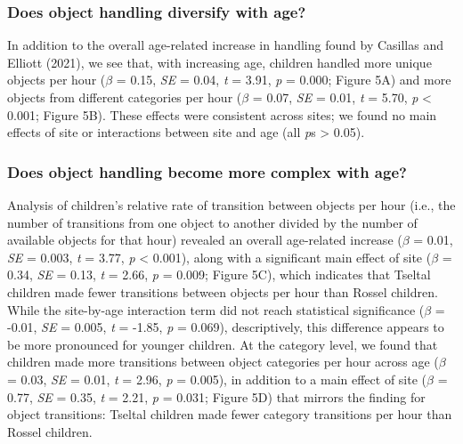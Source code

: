\documentclass[10pt, letterpaper]{article}
\begin{document}
\hypertarget{does-object-handling-diversify-with-age}{%
\subsubsection{Does object handling diversify with
age?}\label{does-object-handling-diversify-with-age}}

In addition to the overall age-related increase in handling found by
Casillas and Elliott (2021), we see that, with increasing age, children
handled more unique objects per hour (\(\beta\) = 0.15, \emph{SE} =
0.04, \emph{t} = 3.91, \emph{p} = 0.000; Figure 5A) and more objects
from different categories per hour (\(\beta\) = 0.07, \emph{SE} = 0.01,
\emph{t} = 5.70, \emph{p} \textless{} 0.001; Figure 5B). These effects
were consistent across sites; we found no main effects of site or
interactions between site and age (all \emph{p}s \textgreater{}
0.05).\newline

\hypertarget{does-object-handling-become-more-complex-with-age}{%
\subsubsection{Does object handling become more complex with
age?}\label{does-object-handling-become-more-complex-with-age}}

Analysis of children's relative rate of transition between objects per
hour (i.e., the number of transitions from one object to another divided
by the number of available objects for that hour) revealed an overall
age-related increase (\(\beta\) = 0.01, \emph{SE} = 0.003, \emph{t} =
3.77, \emph{p} \textless{} 0.001), along with a significant main effect
of site (\(\beta\) = 0.34, \emph{SE} = 0.13, \emph{t} = 2.66, \emph{p} =
0.009; Figure 5C), which indicates that Tseltal children made fewer
transitions between objects per hour than Rossel children. While the
site-by-age interaction term did not reach statistical significance
(\(\beta\) = -0.01, \emph{SE} = 0.005, \emph{t} = -1.85, \emph{p} =
0.069), descriptively, this difference appears to be more pronounced for
younger children. At the category level, we found that children made
more transitions between object categories per hour across age
(\(\beta\) = 0.03, \emph{SE} = 0.01, \emph{t} = 2.96, \emph{p} = 0.005),
in addition to a main effect of site (\(\beta\) = 0.77, \emph{SE} =
0.35, \emph{t} = 2.21, \emph{p} = 0.031; Figure 5D) that mirrors the
finding for object transitions: Tseltal children made fewer category
transitions per hour than Rossel children.
\end{document}
